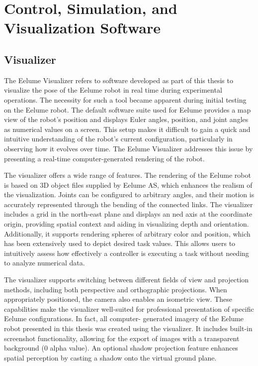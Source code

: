 \chapter{Control, Simulation, and Visualization Software}
\label{ch:software}

\section{Visualizer}

The Eelume Visualizer refers to software developed as part of this thesis to 
visualize the pose of the Eelume robot in real time during experimental 
operations. The necessity for such a tool became apparent during initial 
testing on the Eelume robot. The default software suite used for Eelume 
provides a map view of the robot's position and displays Euler angles, position,
and joint angles as numerical values on a screen. This setup makes it 
difficult to gain a quick and intuitive understanding of the robot's current 
configuration, particularly in observing how it evolves over time. The Eelume 
Visualizer addresses this issue by presenting a real-time computer-generated 
rendering of the robot.

The visualizer offers a wide range of features. The rendering of the Eelume 
robot is based on 3D object files supplied by Eelume AS, which enhances the 
realism of the visualization. Joints can be configured to arbitrary angles, 
and their motion is accurately represented through the bending of the 
connected links. The visualizer includes a grid in the north-east plane and 
displays an \gls{ned} axis at the coordinate origin, providing spatial context 
and aiding in visualizing depth and orientation. Additionally, it supports 
rendering spheres of arbitrary color and position, which has been extensively 
used to depict desired task values. This allows users to intuitively assess 
how effectively a controller is executing a task without needing to analyze 
numerical data.

The visualizer supports switching between different fields of view and 
projection methods, including both perspective and orthographic projections. 
When appropriately positioned, the camera also enables an isometric view. 
These capabilities make the visualizer well-suited for professional 
presentation of specific Eelume configurations. In fact, all computer-
generated imagery of the Eelume robot presented in this thesis was created 
using the visualizer. It includes built-in screenshot functionality, allowing 
for the export of images with a transparent background (\(0\) alpha value). An 
optional shadow projection feature enhances spatial perception by casting a 
shadow onto the virtual ground plane.

